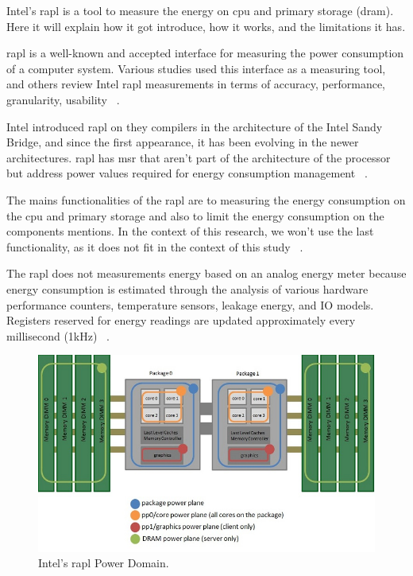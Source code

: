    Intel’s \gls{rapl} is a tool to measure the energy on \gls{cpu} and primary storage (\gls{dram}). Here it will explain how it got introduce, how it works, and the limitations it has.
	
	\gls{rapl} is a well-known and accepted interface for measuring the power consumption of a computer system. Various studies used this interface as a measuring tool, and others review Intel \gls{rapl} measurements in terms of accuracy, performance, granularity, usability ~\cite{raplpref,raplpref2}.
	

	Intel introduced \gls{rapl} on they compilers in the architecture of the Intel Sandy Bridge, and since the first appearance, it has been evolving in the newer architectures. \gls{rapl} has \gls{msr} that aren't part of the architecture of the processor but address power values required for energy consumption management ~\cite{raplpref,intel64and,portela2016}.
	
	
    The mains functionalities of the \gls{rapl} are to measuring the energy consumption on the \gls{cpu} and primary storage and also to limit the energy consumption on the components mentions. In the context of this research, we won't use the last functionality, as it does not fit in the context of this study ~\cite{raplpref,raplpref2,intel64and}.
	
	
	The \gls{rapl} does not measurements energy based on an analog energy meter because energy consumption is estimated through the analysis of various hardware performance counters, temperature sensors, leakage energy, and IO models.  Registers reserved for energy readings are updated approximately every millisecond (1kHz) ~\cite{energypapi,portela2016}.

    \begin{figure}[ht!]
    \centering
    \includegraphics[width=\linewidth]{Chapters/images/power_domains2.jpg}  \caption{Intel’s \gls{rapl} Power Domain.}
    \label{fig:powerdomain}
    \end{figure}
    
